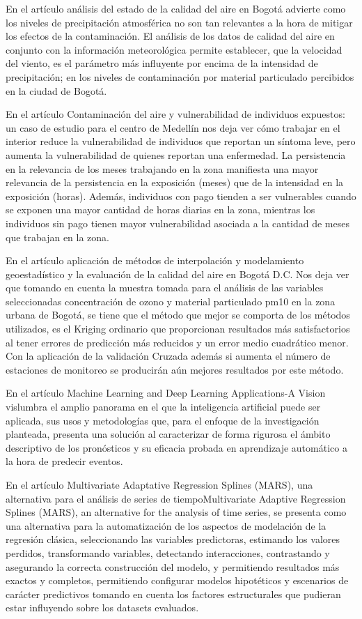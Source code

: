 En el artículo análisis del estado de la calidad del aire en Bogotá advierte como los niveles de precipitación atmosférica no son tan relevantes a la hora de mitigar los efectos de la contaminación.
El análisis de los datos de calidad del aire en conjunto con la información meteorológica permite establecer, que la velocidad del viento, es el parámetro más influyente por encima de la intensidad de precipitación; en los niveles de contaminación por material particulado percibidos en la ciudad de Bogotá. \cite{GAITAN2007} 

En el artículo Contaminación del aire y vulnerabilidad de individuos expuestos: un caso de estudio para el centro de Medellín nos deja ver cómo trabajar en el interior reduce la vulnerabilidad de individuos que reportan un síntoma leve, pero aumenta la vulnerabilidad de quienes reportan una enfermedad. La persistencia en la relevancia de los meses trabajando en la zona manifiesta una mayor relevancia de la persistencia en la exposición (meses) que de la intensidad en la exposición (horas). Además, individuos con pago tienden a ser vulnerables cuando se exponen una mayor cantidad de horas diarias en la zona, mientras los individuos sin pago tienen mayor vulnerabilidad asociada a la cantidad de meses que trabajan en la zona. \cite{GAVIRIAG2012}

En el artículo aplicación de métodos de interpolación y modelamiento geoestadístico y la evaluación de la calidad del aire en Bogotá D.C. Nos deja ver que tomando en cuenta la muestra tomada para el análisis de las variables seleccionadas concentración de ozono y material particulado pm10 en la zona urbana de Bogotá, se tiene que el método que mejor se comporta de los métodos utilizados, es el Kriging ordinario que proporcionan resultados más satisfactorios al tener errores de predicción más reducidos y un error medio cuadrático menor. Con la aplicación de la validación Cruzada además si aumenta el número de estaciones de monitoreo se producirán aún mejores resultados por este método.\cite{RODRIGUEZ2015}

En el artículo Machine Learning and Deep Learning Applications-A Vision vislumbra el amplio panorama en el que la inteligencia artificial puede ser aplicada, sus usos y metodologías que, para el enfoque de la investigación planteada, presenta una solución al caracterizar de forma rigurosa el ámbito descriptivo de los pronósticos y su eficacia probada en aprendizaje automático a la hora de predecir eventos.\cite{SHARMA2021}

En el artículo Multivariate Adaptative Regression Splines (MARS), una alternativa para el análisis de series de tiempoMultivariate Adaptive Regression Splines (MARS), an alternative for the analysis of time series, se presenta como una alternativa para la automatización de los aspectos de modelación de la regresión clásica, seleccionando las variables predictoras, estimando los valores perdidos, transformando variables, detectando interacciones, contrastando y asegurando la correcta construcción del modelo, y permitiendo resultados más exactos y completos, permitiendo configurar modelos hipotéticos y escenarios de carácter predictivos tomando en cuenta los factores estructurales que pudieran estar influyendo sobre los datasets evaluados.\cite{VANEGAS2017235}

